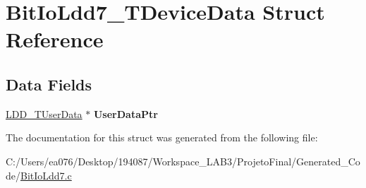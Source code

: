 \hypertarget{struct_bit_io_ldd7___t_device_data}{\section{Bit\-Io\-Ldd7\-\_\-\-T\-Device\-Data Struct Reference}
\label{struct_bit_io_ldd7___t_device_data}
}
\subsection*{Data Fields}
\begin{DoxyCompactItemize}
\item 
\hypertarget{struct_bit_io_ldd7___t_device_data_a7bdd719796f307646c46d0f6eb36b011}{\hyperlink{group___p_e___types__module_ga0b66a73f87238a782318aa0be7578e35}{L\-D\-D\-\_\-\-T\-User\-Data} $\ast$ {\bfseries User\-Data\-Ptr}}\label{struct_bit_io_ldd7___t_device_data_a7bdd719796f307646c46d0f6eb36b011}

\end{DoxyCompactItemize}


The documentation for this struct was generated from the following file\-:\begin{DoxyCompactItemize}
\item 
C\-:/\-Users/ea076/\-Desktop/194087/\-Workspace\-\_\-\-L\-A\-B3/\-Projeto\-Final/\-Generated\-\_\-\-Code/\hyperlink{_bit_io_ldd7_8c}{Bit\-Io\-Ldd7.\-c}\end{DoxyCompactItemize}
